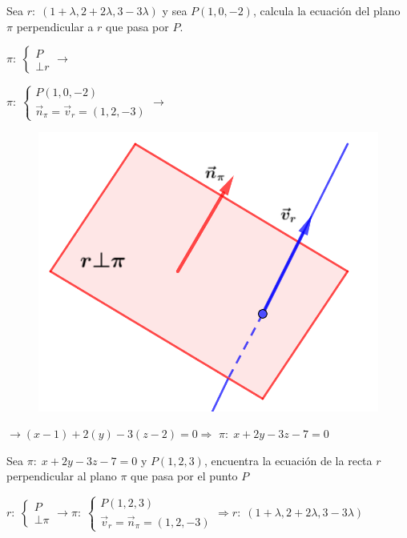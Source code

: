 \begin{ejre}
	Sea $r:\; (1+\lambda, 2+2\lambda, 3-3\lambda)$ y sea $P(1,0,-2)$, calcula la ecuación del plano $\pi$ perpendicular a $r$ que pasa por $P$.
\end{ejre}
\begin{proofw}\renewcommand{\qedsymbol}{$\diamond$}

\begin{multicols}{2}
$\pi:\; \begin{cases} P \\ \bot r \end{cases} \to $
	
\noindent $\pi:\; \begin{cases} P(1,0,-2) \\ \vec n_{\pi}=\vec v_r=(1,2,-3) \end{cases} \to $ 
\begin{figure}[H]
		\centering
		\includegraphics[width=.35\textwidth]{imagenes/imagenes10/T10IM23.png}
 	\end{figure}
\end{multicols}
\noindent $\to (x-1)+2(y)-3(z-2)=0 \Rightarrow $
$\pi:\; x+2y-3z-7=0$
\end{proofw}




\begin{ejre}
	Sea $\pi:\; x+2y-3z-7=0$ y $P(1,2,3)$, encuentra la ecuación de la recta $r$ perpendicular al plano $\pi$ que pasa por el punto $P$
\end{ejre}

\begin{proofw}\renewcommand{\qedsymbol}{$\diamond$}
	$r:\; \begin{cases} P\\ \bot \pi \end{cases} \to \pi:\; \begin{cases} P(1,2,3) \\ \vec v_r=\vec n_{\pi}=(1,2,-3) \end{cases} \Rightarrow r:\; (1+\lambda, 2+2\lambda, 3-3\lambda)$
\end{proofw}




